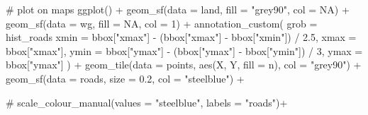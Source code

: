 \documentclass[]{article}
\newenvironment{Shaded}{}{}
\newcommand{\CommentTok}[1]{\textcolor[rgb]{0.00,0.50,0.00}{#1}}
\newcommand{\DataTypeTok}[1]{#1}
\newcommand{\DecValTok}[1]{#1}
\newcommand{\FloatTok}[1]{#1}
\newcommand{\KeywordTok}[1]{\textcolor[rgb]{0.00,0.00,1.00}{#1}}
\newcommand{\NormalTok}[1]{#1}
\newcommand{\OperatorTok}[1]{#1}
\newcommand{\OtherTok}[1]{\textcolor[rgb]{1.00,0.25,0.00}{#1}}
\newcommand{\StringTok}[1]{\textcolor[rgb]{0.00,0.50,0.50}{#1}}
\begin{document}
\begin{Shaded}
\begin{Highlighting}[]
\CommentTok{# plot on maps}
\KeywordTok{ggplot}\NormalTok{() }\OperatorTok{+}
\StringTok{  }\KeywordTok{geom_sf}\NormalTok{(}\DataTypeTok{data =}\NormalTok{ land, }\DataTypeTok{fill =} \StringTok{"grey90"}\NormalTok{, }\DataTypeTok{col =} \OtherTok{NA}\NormalTok{) }\OperatorTok{+}
\StringTok{  }\KeywordTok{geom_sf}\NormalTok{(}\DataTypeTok{data =}\NormalTok{ wg, }\DataTypeTok{fill =} \OtherTok{NA}\NormalTok{, }\DataTypeTok{col =} \DecValTok{1}\NormalTok{) }\OperatorTok{+}
\StringTok{  }\KeywordTok{annotation_custom}\NormalTok{(}
    \DataTypeTok{grob =}\NormalTok{ hist_roads }\OperatorTok{%
    \DataTypeTok{xmin =}\NormalTok{ bbox[}\StringTok{"xmax"}\NormalTok{] }\OperatorTok{-}\StringTok{ }\NormalTok{(bbox[}\StringTok{"xmax"}\NormalTok{] }\OperatorTok{-}\StringTok{ }\NormalTok{bbox[}\StringTok{"xmin"}\NormalTok{]) }\OperatorTok{/}\StringTok{ }\FloatTok{2.5}\NormalTok{,}
    \DataTypeTok{xmax =}\NormalTok{ bbox[}\StringTok{"xmax"}\NormalTok{],}
    \DataTypeTok{ymin =}\NormalTok{ bbox[}\StringTok{"ymax"}\NormalTok{] }\OperatorTok{-}\StringTok{ }\NormalTok{(bbox[}\StringTok{"ymax"}\NormalTok{] }\OperatorTok{-}\StringTok{ }\NormalTok{bbox[}\StringTok{"ymin"}\NormalTok{]) }\OperatorTok{/}\StringTok{ }\DecValTok{3}\NormalTok{,}
    \DataTypeTok{ymax =}\NormalTok{ bbox[}\StringTok{"ymax"}\NormalTok{]}
\NormalTok{  ) }\OperatorTok{+}
\StringTok{  }\KeywordTok{geom_tile}\NormalTok{(}\DataTypeTok{data =}\NormalTok{ points, }\KeywordTok{aes}\NormalTok{(X, Y, }\DataTypeTok{fill =}\NormalTok{ n), }\DataTypeTok{col =} \StringTok{"grey90"}\NormalTok{) }\OperatorTok{+}
\StringTok{  }\KeywordTok{geom_sf}\NormalTok{(}\DataTypeTok{data =}\NormalTok{ roads, }\DataTypeTok{size =} \FloatTok{0.2}\NormalTok{, }\DataTypeTok{col =} \StringTok{"steelblue"}\NormalTok{) }\OperatorTok{+}

\StringTok{  }\CommentTok{# scale_colour_manual(values = "steelblue", labels = "roads")+}

}
\end{Highlighting}
\end{Shaded}
\end{document}
